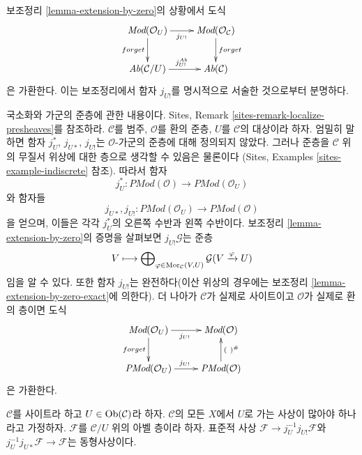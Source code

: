 \begin{remark}
\label{remark-localize-shriek-equal}
보조정리 \ref{lemma-extension-by-zero}의 상황에서 도식
$$
\xymatrix{
\textit{Mod}(\mathcal{O}_U) \ar[r]_{j_{U!}} \ar[d]_{forget} &
\textit{Mod}(\mathcal{O}_\mathcal{C}) \ar[d]^{forget} \\
\textit{Ab}(\mathcal{C}/U) \ar[r]^{j^{Ab}_{U!}} &
\textit{Ab}(\mathcal{C})
}
$$
은 가환한다. 이는 보조정리에서 함자 $j_{U!}$를 명시적으로 서술한
것으로부터 분명하다.
\end{remark}

\begin{remark}
\label{remark-localize-presheaves}
국소화와 가군의 준층에 관한 내용이다. Sites, Remark
\ref{sites-remark-localize-presheaves}를 참조하라. $\mathcal{C}$를 범주,
$\mathcal{O}$를 환의 준층, $U$를 $\mathcal{C}$의 대상이라 하자.
엄밀히 말하면 함자 $j_U^*$, $j_{U*}$, $j_{U!}$는
$\mathcal{O}$-가군의 준층에 대해 정의되지 않았다. 그러나 준층을
$\mathcal{C}$ 위의 무질서 위상에 대한 층으로 생각할 수 있음은 물론이다
(Sites, Examples \ref{sites-example-indiscrete} 참조). 따라서 함자
$$
j_U^* :
\textit{PMod}(\mathcal{O})
\longrightarrow
\textit{PMod}(\mathcal{O}_U)
$$
와 함자들
$$
j_{U*}, j_{U!} :
\textit{PMod}(\mathcal{O}_U)
\longrightarrow
\textit{PMod}(\mathcal{O})
$$
을 얻으며, 이들은 각각 $j_U^*$의 오른쪽 수반과 왼쪽 수반이다.
보조정리 \ref{lemma-extension-by-zero}의 증명을 살펴보면
$j_{U!}\mathcal{G}$는 준층
$$
V \longmapsto
\bigoplus\nolimits_{\varphi \in \mathop{\mathrm{Mor}}\nolimits_\mathcal{C}(V, U)}
\mathcal{G}(V \xrightarrow{\varphi} U)
$$
임을 알 수 있다. 또한 함자 $j_{U!}$는 완전하다(이산 위상의 경우에는
보조정리 \ref{lemma-extension-by-zero-exact}에 의한다). 더 나아가
$\mathcal{C}$가 실제로 사이트이고 $\mathcal{O}$가 실제로 환의 층이면 도식
$$
\xymatrix{
\textit{Mod}(\mathcal{O}_U) \ar[r]_{j_{U!}} \ar[d]_{forget} &
\textit{Mod}(\mathcal{O}) \\
\textit{PMod}(\mathcal{O}_U) \ar[r]^{j_{U!}} &
\textit{PMod}(\mathcal{O}) \ar[u]_{(\ )^\#}
}
$$
은 가환한다.
\end{remark}

\begin{lemma}
\label{lemma-restrict-back}
$\mathcal{C}$를 사이트라 하고 $U \in \mathop{\mathrm{Ob}}\nolimits(\mathcal{C})$라 하자.
$\mathcal{C}$의 모든 $X$에서 $U$로 가는 사상이 많아야 하나라고 가정하자.
$\mathcal{F}$를 $\mathcal{C}/U$ 위의 아벨 층이라 하자. 표준적 사상
$\mathcal{F} \to j_U^{-1}j_{U!}\mathcal{F}$와
$j_U^{-1}j_{U*}\mathcal{F} \to \mathcal{F}$는 동형사상이다.
\end{lemma}

